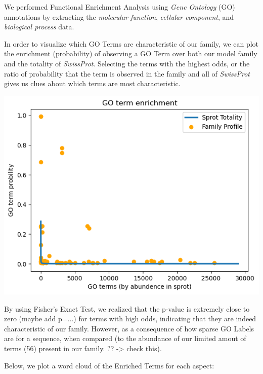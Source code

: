 \documentclass[10pt,twocolumn,letterpaper]{article}
\begin{document}
We performed Functional Enrichment Analysis using \textit{Gene Ontology} (GO) annotations by extracting the \textit{molecular function}, \textit{cellular component}, and \textit{biological process} data.


In order to visualize which GO Terms are characteristic of our family, we can plot the enrichment (probability) of observing a GO Term over both our model family and the totality of \textit{SwissProt}. Selecting the terms with the highest odds, or the ratio of probability that the term is observed in the family and all of \textit{SwissProt} gives us clues about which terms are most characteristic. 

\begin{center}
    \includegraphics[scale=0.4]{report/img/go_term_enrichment.png}
\end{center}

By using Fisher's Exact Test, we realized that the p-value is extremely close to zero (maybe add p=...) for terms with high odds, indicating that they are indeed characteristic of our family. However, as a consequence of how sparse GO Labels are for a sequence, when compared (to the abundance of our limited amout of terms (56) present in our family. ?? -> check this).

Below, we plot a word cloud of the Enriched Terms for each aspect:
\end{document}
